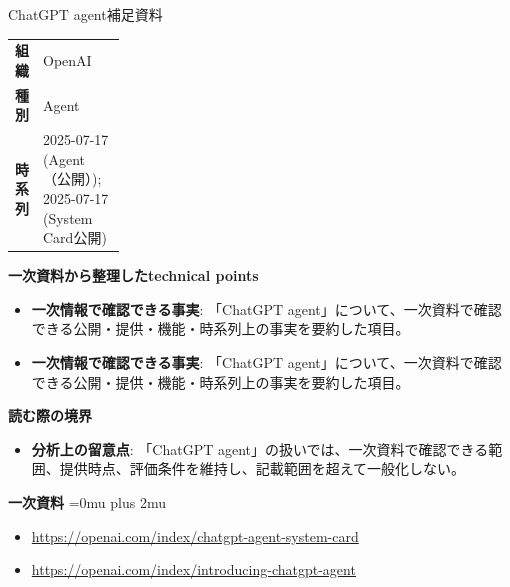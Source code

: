 \begin{technicalnote}{ChatGPT agent}{補足資料}
\begingroup
\begin{tabularx}{\linewidth}{@{}>{\bfseries}p{0.22\linewidth}X@{}}
組織 & OpenAI \\
種別 & Agent \\
時系列 & 2025-07-17 (Agent（公開）); 2025-07-17 (System Card公開) \\
\end{tabularx}
\smallskip
{\bfseries 一次資料から整理したtechnical points}
\begin{itemize}[leftmargin=1.5em,itemsep=0.35em]
\item \textbf{一次情報で確認できる事実}: 「ChatGPT agent」について、一次資料で確認できる公開・提供・機能・時系列上の事実を要約した項目。
\item \textbf{一次情報で確認できる事実}: 「ChatGPT agent」について、一次資料で確認できる公開・提供・機能・時系列上の事実を要約した項目。
\end{itemize}
\begin{minipage}{\linewidth}
{\bfseries 読む際の境界}
\begin{itemize}[leftmargin=1.5em,itemsep=0.35em]
\item \textbf{分析上の留意点}: 「ChatGPT agent」の扱いでは、一次資料で確認できる範囲、提供時点、評価条件を維持し、記載範囲を超えて一般化しない。
\end{itemize}
\begin{samepage}
{\bfseries 一次資料}
\begingroup\sloppy
\Urlmuskip=0mu plus 2mu\relax
\begin{itemize}[leftmargin=1.5em,itemsep=0.25em]
\item {\scriptsize\url{https://openai.com/index/chatgpt-agent-system-card}}
\item {\scriptsize\url{https://openai.com/index/introducing-chatgpt-agent}}
\end{itemize}
\endgroup
\end{samepage}
\end{minipage}
\endgroup
\end{technicalnote}
\medskip

